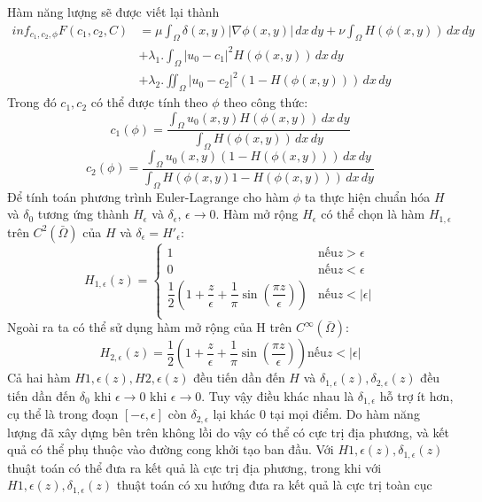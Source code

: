 \documentclass[12pt,oneside,a4]{report}
\begin{document}
Hàm năng lượng sẽ được viết lại thành
\begin{equation}
\begin{split}
inf_{c_1,c_2,\phi} F(c_1, c_2, C)&=\mu \int_{\Omega}\delta(x,y)|\nabla \phi(x,y)|\,dx\,dy+\nu  \int_{\Omega}H( \phi(x,y))\,dx\,dy \\ 
&+\lambda_1 .\int_{\Omega} |u_0-c_1|^2H(\phi(x,y)) \,dx\,dy\\&+\lambda_2 .\iint_{\Omega} |u_0-c_2|^2(1-H(\phi(x,y))) \,dx\,dy
\end{split}
\end{equation}
Trong đó $c_1, c_2$ có thể được tính theo $\phi$ theo công thức:
\begin{equation}
c_1(\phi)=\dfrac{\int_{\Omega}u_0(x,y)H(\phi(x,y))\,dx \,dy}{\int_{\Omega}H(\phi(x,y))\,dx\,dy}
\end{equation}
\begin{equation}
c_2(\phi)=\dfrac{\int_{\Omega}u_0(x,y)(1-H(\phi(x,y)))\,dx \,dy}{\int_{\Omega}H(\phi(x,y)1-H(\phi(x,y)))\,dx\,dy}
\end{equation}
Để tính toán phương trình Euler-Lagrange cho hàm $\phi$ ta thực hiện chuẩn hóa $H$ và $\delta_0$ tương ứng thành  $H_{\epsilon}$ và $\delta_{\epsilon}$, $\epsilon \rightarrow 0$. Hàm mở rộng $H_{\epsilon}$ có thể chọn là hàm $H_{1,{\epsilon}}$ trên $C^2(\bar{\Omega})$ của $H$ và $\delta_{\epsilon}=H'_{\epsilon}$:
\begin{equation}
 H_{1,\epsilon}(z)=
\begin{cases}
 1 & \text{nếu} z> \epsilon\\
0 & \text{nếu} z <\epsilon \\
\dfrac{1}{2}(1+\dfrac{z}{\epsilon}+\dfrac{1}{\pi}\sin(\dfrac{\pi z}{\epsilon})) & \text{nếu} z <|\epsilon|\\
   \end{cases}
\end{equation}
Ngoài ra ta có thể sử dụng hàm mở rộng của H trên $C^{\infty}(\bar{\Omega})$:
\begin{equation}
 H_{2,\epsilon}(z)=\dfrac{1}{2}(1+\dfrac{z}{\epsilon}+\dfrac{1}{\pi}\sin(\dfrac{\pi z}{\epsilon}))  \text{nếu} z <|\epsilon|
\end{equation}
Cả hai hàm $ H{1,\epsilon}(z),  H{2,\epsilon}(z)$ đều tiến dần đến $H$ và $ \delta_{1,\epsilon}(z),  \delta_{2,\epsilon}(z)$ đều tiến dần đến $\delta_0$ khi $\epsilon\rightarrow 0$ khi $\epsilon\rightarrow 0$. Tuy vậy điều khác nhau là $ \delta_{1,\epsilon}$ hỗ trợ ít hơn, cụ thể là trong đoạn $[-\epsilon, \epsilon]$ còn $ \delta_{2,\epsilon}$ lại khác 0 tại mọi điểm. Do hàm năng lượng đã xây dựng bên trên không lồi do vậy có thể có cực trị địa phương, và kết quả có thể phụ thuộc vào đường cong khởi tạo ban đầu. Với $H{1,\epsilon}(z), \delta_{1,\epsilon}(z)$ thuật toán có thể đưa ra kết quả là cực trị địa phương, trong khi với $H{1,\epsilon}(z), \delta_{1,\epsilon}(z)$ thuật toán có xu hướng đưa ra kết quả là cực trị toàn cục
\end{document}
